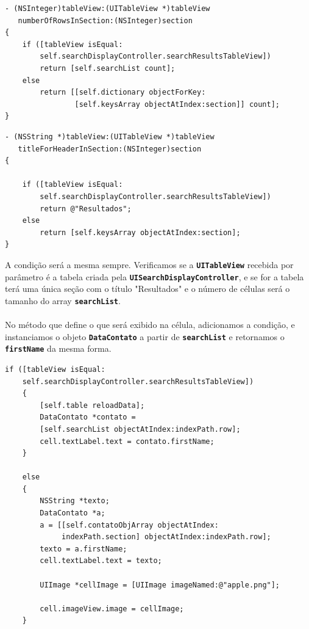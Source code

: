 \documentclass[a4paper,12pt,brazil,doubleside]{book}
\begin{document}
\begin{listing}
\begin{verbatim}
- (NSInteger)tableView:(UITableView *)tableView
   numberOfRowsInSection:(NSInteger)section
{
    if ([tableView isEqual:
        self.searchDisplayController.searchResultsTableView])
        return [self.searchList count];
    else
        return [[self.dictionary objectForKey:
                [self.keysArray objectAtIndex:section]] count];
}
\end{verbatim}
\end{listing}

\pagebreak

\begin{listing}
\begin{verbatim}
- (NSString *)tableView:(UITableView *)tableView
   titleForHeaderInSection:(NSInteger)section
{
    
    if ([tableView isEqual:
        self.searchDisplayController.searchResultsTableView])
        return @"Resultados";
    else
        return [self.keysArray objectAtIndex:section];
}
\end{verbatim}
\end{listing}

A condição será a mesma sempre. Verificamos se a \texttt{\textbf{UITableView}} recebida por parâmetro é a tabela criada pela \texttt{\textbf{UISearchDisplayController}}, e se for a tabela terá uma única seção com o título "Resultados" e o número de células será o tamanho do array \texttt{\textbf{searchList}}.
\paragraph{}No método que define o que será exibido na célula, adicionamos a condição, e instanciamos o objeto \texttt{\textbf{DataContato}} a partir de \texttt{\textbf{searchList}} e retornamos o \texttt{\textbf{firstName}} da mesma forma.

\begin{listing}
\begin{verbatim}
if ([tableView isEqual:
    self.searchDisplayController.searchResultsTableView])
    {
        [self.table reloadData];
        DataContato *contato =
        [self.searchList objectAtIndex:indexPath.row];
        cell.textLabel.text = contato.firstName;
    }
    
    else
    {
        NSString *texto;
        DataContato *a;
        a = [[self.contatoObjArray objectAtIndex:
             indexPath.section] objectAtIndex:indexPath.row];
        texto = a.firstName;
        cell.textLabel.text = texto;
        
        UIImage *cellImage = [UIImage imageNamed:@"apple.png"];
        
        cell.imageView.image = cellImage;
    }
\end{verbatim}
\end{listing}
\end{document}
